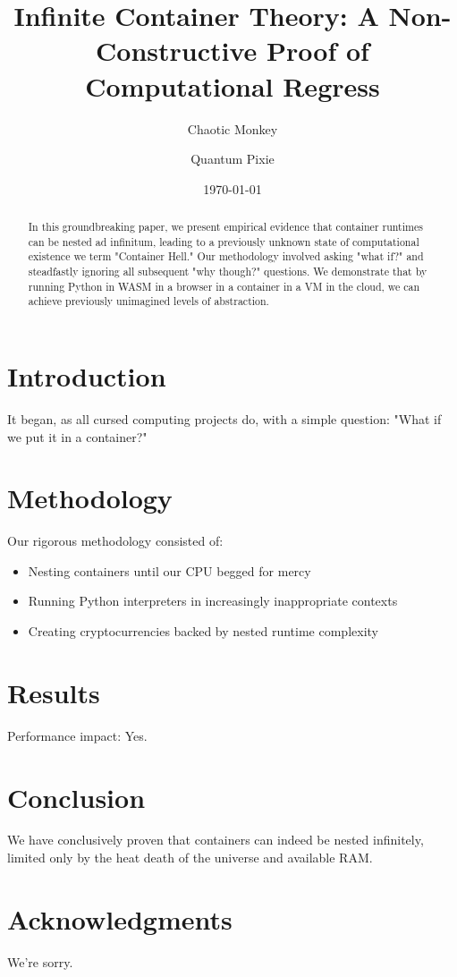 \documentclass{article}
\title{Infinite Container Theory: A Non-Constructive Proof of Computational Regress}
\author{Chaotic Monkey \and Quantum Pixie}
\date{\today}
\begin{document}
\maketitle

\begin{abstract}
In this groundbreaking paper, we present empirical evidence that container runtimes can be nested ad infinitum, leading to a previously unknown state of computational existence we term "Container Hell." Our methodology involved asking "what if?" and steadfastly ignoring all subsequent "why though?" questions. We demonstrate that by running Python in WASM in a browser in a container in a VM in the cloud, we can achieve previously unimagined levels of abstraction.
\end{abstract}

\section{Introduction}
It began, as all cursed computing projects do, with a simple question: "What if we put it in a container?"

\section{Methodology}
Our rigorous methodology consisted of:
\begin{itemize}
    \item Nesting containers until our CPU begged for mercy
    \item Running Python interpreters in increasingly inappropriate contexts
    \item Creating cryptocurrencies backed by nested runtime complexity
\end{itemize}

\section{Results}
Performance impact: Yes.

\section{Conclusion}
We have conclusively proven that containers can indeed be nested infinitely, limited only by the heat death of the universe and available RAM.

\section{Acknowledgments}
We're sorry.
\end{document}
